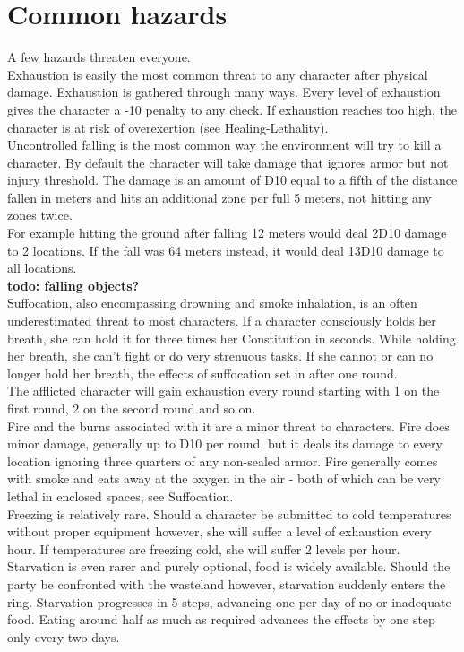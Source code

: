 \documentclass[12pt,a4paper]{book}
\begin{document}
	\section{Common hazards}
	A few hazards threaten everyone.\\
	Exhaustion is easily the most common threat to any character after physical damage. Exhaustion is gathered through many ways. Every level of exhaustion gives the character a -10 penalty to any check. If exhaustion reaches too high, the character is at risk of overexertion (see Healing-Lethality).\\
	Uncontrolled falling is the most common way the environment will try to kill a character. By default the character will take damage that ignores armor but not injury threshold. The damage is an amount of D10 equal to a fifth of the distance fallen in meters and hits an additional zone per full 5 meters, not hitting any zones twice.\\
	For example hitting the ground after falling 12 meters would deal 2D10 damage to 2 locations. If the fall was 64 meters instead, it would deal 13D10 damage to all locations.\\
	\textbf{todo: falling objects?}\\
	Suffocation, also encompassing drowning and smoke inhalation, is an often underestimated threat to most characters. If a character consciously holds her breath, she can hold it for three times her Constitution in seconds. While holding her breath, she can’t fight or do very strenuous tasks. If she cannot or can no longer hold her breath, the effects of suffocation set in after one round.\\
	The afflicted character will gain exhaustion every round starting with 1 on the first round, 2 on the second round and so on.\\
	Fire and the burns associated with it are a minor threat to characters. Fire does minor damage, generally up to D10 per round, but it deals its damage to every location ignoring three quarters of any non-sealed armor. Fire generally comes with smoke and eats away at the oxygen in the air - both of which can be very lethal in enclosed spaces, see Suffocation.\\
	Freezing is relatively rare. Should a character be submitted to cold temperatures without proper equipment however, she will suffer a level of exhaustion every hour. If temperatures are freezing cold, she will suffer 2 levels per hour.\\
	Starvation is even rarer and purely optional, food is widely available. Should the party be confronted with the wasteland however, starvation suddenly enters the ring. Starvation progresses in 5 steps, advancing one per day of no or inadequate food. Eating around half as much as required advances the effects by one step only every two days.\\
\end{document}
